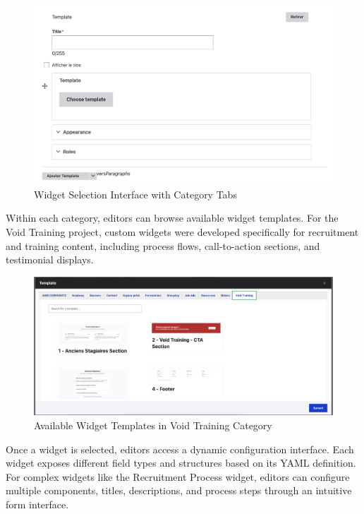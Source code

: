 \begin{figure}[H]
    \centering
    \includegraphics[width=\textwidth]{images/widget_selection.png}
    \caption{Widget Selection Interface with Category Tabs}
    \label{fig:widget_selection}
\end{figure}

\noindent
Within each category, editors can browse available widget templates. For the Void Training project, custom widgets were developed specifically for recruitment and training content, including process flows, call-to-action sections, and testimonial displays.

\begin{figure}[H]
    \centering
    \includegraphics[width=\textwidth]{images/widget_lists.png}
    \caption{Available Widget Templates in Void Training Category}
    \label{fig:widget_lists}
\end{figure}

\noindent
Once a widget is selected, editors access a dynamic configuration interface. Each widget exposes different field types and structures based on its YAML definition. For complex widgets like the Recruitment Process widget, editors can configure multiple components, titles, descriptions, and process steps through an intuitive form interface.

